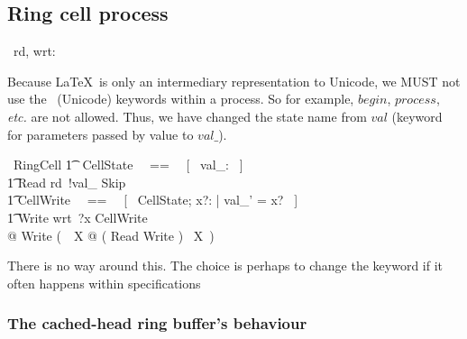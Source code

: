 \documentclass{article}
\begin{document}
\subsection{Ring cell process}

\begin{circus}
  \circchannel\ rd, wrt: \nat
\end{circus}

Because \LaTeX\ is only an intermediary representation to Unicode,
we MUST not use the \Circus\ (Unicode) keywords within a process.
So for example, $begin$, $process$, \textit{etc.} are not allowed.
Thus, we have changed the state name from $val$ (keyword for parameters
passed by value to $val\_$).
\begin{circus}
  \circprocess\ RingCell \circdef \circbegin
  \also
    \t1 \circstate\ CellState ~~==~~ [~ val\_: \nat ~] \\
    \t1 Read \circdef rd~!val\_ \then Skip \\
    \t1 CellWrite ~~==~~ [~ \Delta CellState; x?: \nat | val\_' = x? ~] \\
    \t1 Write \circdef wrt~?x \then CellWrite \\
    @ Write \circseq (~\circmu\ X @ ( Read \extchoice Write ) \circseq\ X~) \\
  \circend
\end{circus}
%
There is no way around this. The choice is perhaps to change the keyword
if it often happens within specifications

\subsubsection{The cached-head ring buffer's behaviour}
\end{document}
